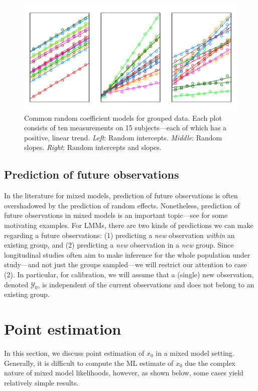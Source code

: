 \documentclass[cmfont,usenames,dvipsnames,leqno]{afit-etd}\usepackage[]{graphicx}\usepackage[]{color}
\makeatletter
\def\maxwidth{ %
  \ifdim\Gin@nat@width>\linewidth
    \linewidth
  \else
    \Gin@nat@width
  \fi
}
\newenvironment{knitrout}{}{} %
\renewenvironment{knitrout}{\begin{singlespace}}{\end{singlespace}}
\newcommand{\mc}[1]{\ensuremath{\mathcal{#1}}}
\makeatother
\begin{document}
\begin{knitrout}
\color{fgcolor}\begin{figure}[H]

\includegraphics[width=\maxwidth]{figure/random-coefficients} \caption[Common random coefficient models for grouped data]{Common random coefficient models for grouped data. Each plot consists of ten measurements on 15 subjects---each of which has a positive, linear trend. \textit{Left}: Random intercepts. \textit{Middle}: Random slopes. \textit{Right}: Random intercepts and slopes.\label{fig:random-coefficients}}
\end{figure}


\end{knitrout}


\subsection{Prediction of future observations}
In the literature for mixed models, prediction of future observations is often overshadowed by the prediction of random effects. Nonetheless, prediction of future observations in mixed models is an important topic---see \citet{jiang_linear_2007} for some motivating examples. For LMMs, there are two kinds of predictions we can make regarding a future observations: (1) predicting a \emph{new} observation \emph{within} an existing group, and (2) predicting a \emph{new} observation in a \emph{new} group. Since longitudinal studies often aim to make inference for the whole population under study---and not just the groups sampled---we will restrict our attention to case (2). In particular, for calibration, we will assume that a (single) new observation, denoted $\mc{Y}_0$, is independent of the current observations and does not belong to an existing group. 

\section{Point estimation}
\label{sec:calibration-lmm-point}
In this section, we discuss point estimation of $x_0$ in a mixed model setting. Generally, it is difficult to compute the ML estimate of $x_0$ due the complex nature of mixed model likelihoods, however, as shown below, some cases yield relatively simple results. 
\end{document}
